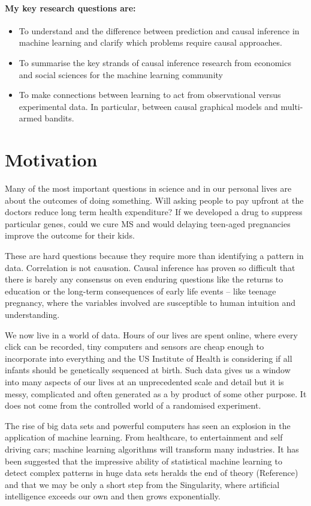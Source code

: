 \documentclass[11pt,a4paper,oneside]{book}
\theoremstyle{plain}
\theoremstyle{definition}
\begin{document}
\paragraph*{My key research questions are:} 
\begin{itemize}
\item To understand and the difference between prediction and causal inference in machine learning and clarify which problems require causal approaches.
\item To summarise the key strands of causal inference research from economics and social sciences for the machine learning community
\item To make connections between learning to act from observational versus experimental data. In particular, between causal graphical models and multi-armed bandits.
\end{itemize}



\section{Motivation}
Many of the most important questions in science and in our personal lives are about the outcomes of doing something. Will asking people to pay upfront at the doctors reduce long term health expenditure? If we developed a drug to suppress particular genes, could we cure MS and would delaying teen-aged pregnancies improve the outcome for their kids.  

These are hard questions because they require more than identifying a pattern in data. Correlation is not causation. Causal inference has proven so difficult that there is barely any consensus on even enduring questions like the returns to education or the long-term consequences of early life events – like teenage pregnancy, where the variables involved are susceptible to human intuition and understanding. 

We now live in a world of data. Hours of our lives are spent online, where every click can be recorded, tiny computers and sensors are cheap enough to incorporate into everything and the US Institute of Health is considering if all infants should be genetically sequenced at birth. Such data gives us a window into many aspects of our lives at an unprecedented scale and detail but it is messy, complicated and often generated as a by product of some other purpose. It does not come from the controlled world of a randomised experiment.

The rise of big data sets and powerful computers has seen an explosion in the application of machine learning. From healthcare, to entertainment and self driving cars; machine learning algorithms will transform many industries. It has been suggested that the impressive ability of statistical machine learning to detect complex patterns in huge data sets heralds the end of theory (Reference) and that we may be only a short step from the Singularity, where artificial intelligence exceeds our own and then grows exponentially. 
\end{document}
